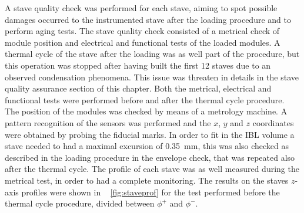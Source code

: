 A stave quality check was performed for each stave, aiming to spot possible damages occurred to the instrumented stave after the loading procedure and to perform aging tests.
The stave quality check consisted of a metrical check of module position and electrical and functional tests of the loaded modules. A thermal cycle of the stave after the loading was as well part of the procedure, but this operation was stopped after having built the first 12 staves due to an observed condensation phenomena. This issue was threaten in details in the stave quality assurance section of this chapter.
Both the metrical, electrical and functional tests were performed before and after the thermal cycle procedure.\\
The position of the modules was checked by means of a metrology machine.  A pattern recognition of the sensors was performed and the $x$, $y$ and $z$ coordinates were obtained by probing the fiducial marks.%
In order to fit in the IBL volume a stave needed to had a maximal excursion of \SI{0.35}{\milli\meter}, this was also checked as described in the loading procedure in the envelope check, that was repeated also after the thermal cycle. The profile of each stave was as well measured during the metrical test, in order to had a complete monitoring. The results on the staves $z$-axis profiles were shown in ~ \ref{fig:staveprof} for the test performed before the thermal cycle procedure, divided between $\phi^+$ and $\phi^-$.


